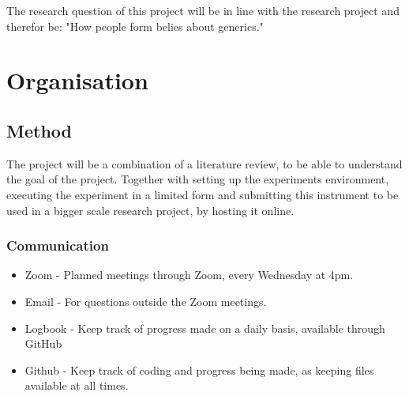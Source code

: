 \documentclass{uva-inf-article}
\begin{document}
The research question of this project will be in line with the research project and therefor be: "How people form belies about generics."



\section{Organisation}
\subsection{Method}
The project will be a combination of a literature review, to be able to understand the goal of the project. Together with setting up the experiments environment, executing the experiment in a limited form and submitting this instrument to be used in a bigger scale research project, by hosting it online.
\subsubsection{Communication}
\begin{itemize}
    \item Zoom - Planned meetings through Zoom, every Wednesday at 4pm.
    \item Email - For questions outside the Zoom meetings.
    \item Logbook - Keep track of progress made on a daily basis, available through GitHub
    \item Github - Keep track of coding and progress being made, as keeping files available at all times.
\end{itemize}

\end{document}
